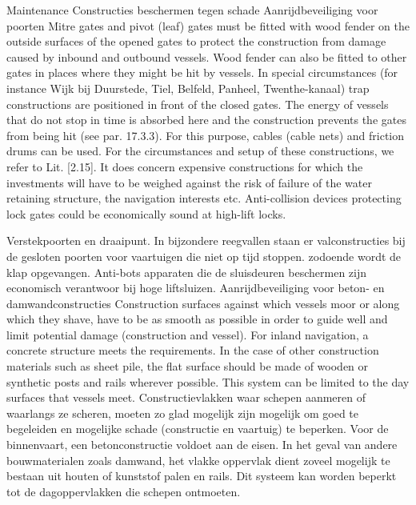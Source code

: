Maintenance
\newline \indent Constructies beschermen tegen schade
Aanrijdbeveiliging voor poorten
Mitre gates and pivot (leaf) gates must be fitted with wood fender on the outside surfaces of the
opened gates to protect the construction from damage caused by inbound and outbound vessels. Wood
fender can also be fitted to other gates in places where they might be hit by vessels.
In special circumstances (for instance Wijk bij Duurstede, Tiel, Belfeld, Panheel, Twenthe-kanaal) trap
constructions are positioned in front of the closed gates. The energy of vessels that do not stop in time
is absorbed here and the construction prevents the gates from being hit (see par. 17.3.3). For this purpose,
cables (cable nets) and friction drums can be used. For the circumstances and setup of these constructions,
we refer to Lit. [2.15]. It does concern expensive constructions for which the investments will
have to be weighed against the risk of failure of the water retaining structure, the navigation interests
etc.
Anti-collision devices protecting lock gates could be economically sound at high-lift locks.

Verstekpoorten en draaipunt. In bijzondere reegvallen staan er valconstructies bij de gesloten poorten voor vaartuigen die niet op tijd stoppen. zodoende wordt de klap opgevangen.
Anti-bots apparaten die de sluisdeuren beschermen  zijn economisch verantwoor bij hoge liftsluizen.
Aanrijdbeveiliging voor beton- en damwandconstructies
Construction surfaces against which vessels moor or along which they shave, have to be as smooth as
possible in order to guide well and limit potential damage (construction and vessel). For inland navigation,
a concrete structure meets the requirements. In the case of other construction materials such as
sheet pile, the flat surface should be made of wooden or synthetic posts and rails wherever possible. This
system can be limited to the day surfaces that vessels meet.
Constructievlakken waar schepen aanmeren of waarlangs ze scheren, moeten zo glad mogelijk zijn
mogelijk om goed te begeleiden en mogelijke schade (constructie en vaartuig) te beperken. Voor de binnenvaart,
een betonconstructie voldoet aan de eisen. In het geval van andere bouwmaterialen zoals
damwand, het vlakke oppervlak dient zoveel mogelijk te bestaan uit houten of kunststof palen en rails. Dit
systeem kan worden beperkt tot de dagoppervlakken die schepen ontmoeten.

